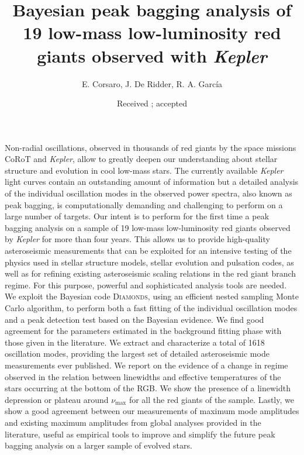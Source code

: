 \documentclass[structabstract]{aa}
\newcommand{\Kepler}{\textit{Kepler}}
\newcommand{\kepler}{\textit{Kepler} }
\newcommand{\numax}{\nu_\mathrm{max}}
\newcommand{\diamonds}{\textsc{D\large{iamonds}}}
\begin{document}
\title{Bayesian peak bagging analysis of 19 low-mass low-luminosity red giants observed with \kepler}
\author{E. Corsaro,
J. De Ridder,
R. A. Garc\'{i}a
          }


   \date{Received ; accepted }

%
\abstract
{Non-radial oscillations, observed in thousands of red giants by the space missions CoRoT and \Kepler, allow to greatly deepen our understanding about stellar structure and evolution in cool low-mass stars. The currently available \kepler light curves contain an outstanding amount of information but a detailed analysis of the individual oscillation modes in the observed power spectra, also known as peak bagging, is computationally demanding and challenging to perform on a large number of targets.} 
{Our intent is to perform for the first time a peak bagging analysis on a sample of 19 low-mass low-luminosity red giants observed by \kepler for more than four years. This allows us to provide high-quality asteroseismic measurements that can be exploited for an intensive testing of the physics used in stellar structure models, stellar evolution and pulsation codes, as well as for refining existing asteroseismic scaling relations in the red giant branch regime.}
{For this purpose, powerful and sophisticated analysis tools are needed. We exploit the Bayesian code \diamonds, using an efficient nested sampling Monte Carlo algorithm, to perform both a fast fitting of the individual oscillation modes and a peak detection test based on the Bayesian evidence.}
{We find good agreement for the parameters estimated in the background fitting phase with those given in the literature. We extract and characterize a total of 1618 oscillation modes, providing the largest set of detailed asteroseismic mode measurements ever published. We report on the evidence of a change in regime observed in the relation between linewidths and effective temperatures of the stars occurring at the bottom of the RGB. We show the presence of a linewidth depression or plateau around $\numax$ for all the red giants of the sample. Lastly, we show a good agreement between our measurements of maximum mode amplitudes and existing maximum amplitudes from global analyses provided in the literature, useful as empirical tools to improve and simplify the future peak bagging analysis on a larger sample of evolved stars.}
{}
\end{document}
